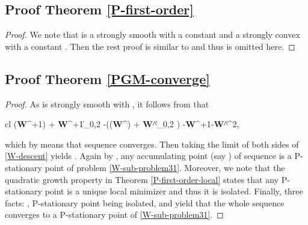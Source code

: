 \documentclass[journal]{IEEEtran}
\newcommand{\ba}{\begin{array}}
\newcommand{\ea}{\end{array}}
\newcommand{\be}{}
\def\W{{\bf W}}
\begin{document}
\subsection{Proof Theorem \ref{P-first-order} }
\begin{proof} We note that  is a strongly smooth with a constant  and a strongly convex with a constant . Then the rest proof is similar to \cite[Theorem 1]{Zhou32021} and thus is omitted here.
\end{proof}

\subsection{Proof Theorem \ref{PGM-converge} }
\begin{proof} As   is  strongly smooth with  , it follows from \cite[Theorem 5.1]{Beck2019} that
\be\label{W-descent}
\ba{cl}
 \Psi(\W^{\ell+1}) + \lambda \|\W^{\ell+1}\|_{0,2} -(\Psi(\W^{\ell}) + \lambda \|\W^{\ell}\|_{0,2} ) \leq -\|\W^{\ell+1}-\W^{\ell}\|^2,
\ea\ee
which by  means that sequence  converges. Then taking the limit of both sides of \eqref{W-descent} yields  . Again by \cite[Theorem 5.1]{Beck2019},
 any accumulating point (say ) of sequence  is a P-stationary point of problem \eqref{W-sub-problem31}. Moreover, we note that the  quadratic growth property in  Theorem \ref{P-first-order-local} states that any P-stationary point is a unique local minimizer and thus it is isolated. Finally,  three facts: \cite[Theorem 4.10]{More1983}, P-stationary point being isolated, and  yield that the whole sequence converges to a P-stationary point of \eqref{W-sub-problem31}.
\end{proof}
\end{document}
